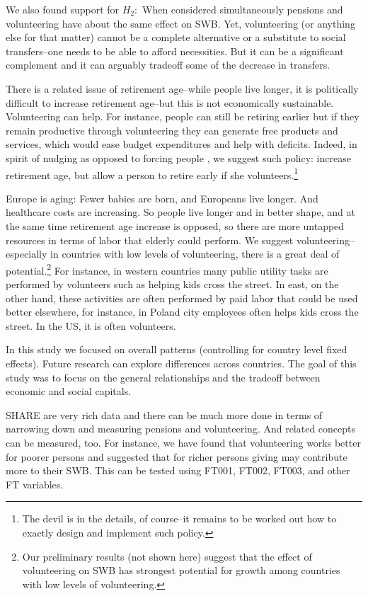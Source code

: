 \documentclass[10pt, letterpaper]{article}
\begin{document}
\begin{spacing}{1.4}
We also found support for $H_2:$ When considered simultaneously pensions and volunteering have about the same effect on SWB.
Yet, volunteering (or anything else for that matter) cannot be a complete alternative
or a substitute to social transfers--one needs to be able to afford necessities.
But it can be a significant complement and it can arguably tradeoff some of the decrease in transfers.

There is a related issue of retirement age--while people live longer, it is
 politically difficult to increase retirement age--but this is not economically
 sustainable. Volunteering can help. For instance, people can still be retiring
 earlier but if they remain productive through volunteering they can generate
 free products and services, which would ease budget expenditures and help with
 deficits. Indeed, in spirit of nudging as opposed to forcing people
 \citep{thaler08}, we suggest such policy: increase retirement age, but allow a
 person to retire early if she volunteers.\footnote{The devil is in the details,
   of course--it remains to be worked out how to exactly design and implement
   such policy.}

Europe is aging: Fewer babies are born, and Europeans live longer. And healthcare
costs are increasing. So people live longer and in better shape, and at the same
time retirement age increase is opposed, so there are more untapped resources in
terms of labor that elderly could perform. We suggest volunteering--especially
in countries with low levels of volunteering, there is a great deal of
potential.\footnote{Our preliminary results (not shown here) suggest that the
  effect of volunteering on SWB has strongest potential for growth among
  countries with low levels of volunteering.}  
%
%
 For instance, in western countries many public utility tasks are performed by volunteers such
as helping kids cross the street. In east, on the other hand, these activities
are often performed by paid labor that could be used better elsewhere, for
instance, in Poland %
 city employees often helps kids cross the street. %
 In the US, it is often volunteers.

In this study we focused on overall patterns (controlling for country level fixed
effects). Future research can explore differences across countries. 
%
The goal of this study was to focus on the general relationships and the tradeoff
between economic and social capitals.

SHARE are very rich data and there can be much more done in terms of narrowing
down and measuring pensions and volunteering. And related concepts can be
measured, too. For instance, we have found that volunteering works better for
poorer persons and suggested that for richer persons giving may contribute more
to their SWB. This can be tested using FT001, FT002, FT003, and other FT
variables.  


\end{spacing}
\end{document}
